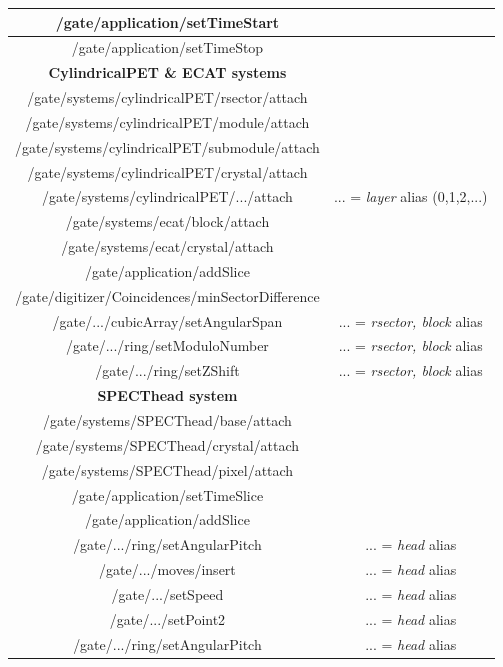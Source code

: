 \documentclass[a4paper, 11pt]{article}
\begin{document}
\begin{table} [h!]
\begin{center}
\begin{tabular}{|c|c|}
  /gate/application/setTimeStart &  \\ \hline
  /gate/application/setTimeStop &  \\ \hline

  \cellcolor{blue!25}\textbf{CylindricalPET \& ECAT systems}& \cellcolor{blue!25} \\ \hline
  
  /gate/systems/cylindricalPET/rsector/attach &  \\ \hline
  /gate/systems/cylindricalPET/module/attach &  \\ \hline       
  /gate/systems/cylindricalPET/submodule/attach &  \\ \hline      
  /gate/systems/cylindricalPET/crystal/attach &  \\ \hline
  /gate/systems/cylindricalPET/.../attach &  ... = \textit{layer} alias (0,1,2,...) \\ \hline
  
  /gate/systems/ecat/block/attach &  \\ \hline
  /gate/systems/ecat/crystal/attach &  \\ \hline

  /gate/application/addSlice &  \\ \hline
  /gate/digitizer/Coincidences/minSectorDifference &  \\ \hline
  /gate/.../cubicArray/setAngularSpan & ... = \textit{rsector, block} alias  \\ \hline
  /gate/.../ring/setModuloNumber & ... = \textit{rsector, block} alias  \\ \hline
  /gate/.../ring/setZShift & ... = \textit{rsector, block} alias  \\ \hline

  \cellcolor{blue!25}\textbf{SPECThead system}& \cellcolor{blue!25} \\ \hline

  /gate/systems/SPECThead/base/attach &  \\ \hline
  /gate/systems/SPECThead/crystal/attach &  \\ \hline
  /gate/systems/SPECThead/pixel/attach &  \\ \hline

  /gate/application/setTimeSlice &  \\ \hline
  /gate/application/addSlice &  \\ \hline
  /gate/.../ring/setAngularPitch & ... = \textit{head} alias  \\ \hline
  /gate/.../moves/insert & ... = \textit{head} alias  \\ \hline
  /gate/.../setSpeed & ... = \textit{head} alias  \\ \hline
  /gate/.../setPoint2 & ... = \textit{head} alias  \\ \hline
  /gate/.../ring/setAngularPitch & ... = \textit{head} alias  \\ \hline

  \end{tabular}
  \end{center}
\end{table}
\end{document}
